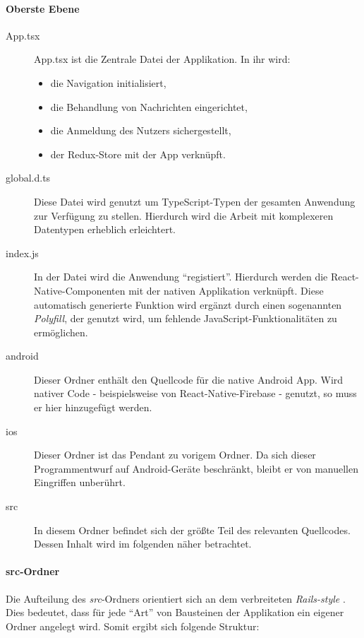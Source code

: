 \paragraph{Oberste Ebene}
\begin{description}
    \item[App.tsx]
    App.tsx ist die Zentrale Datei der Applikation. In ihr wird:
    \begin{itemize}
        \item die Navigation initialisiert,
        \item die Behandlung von Nachrichten eingerichtet,
        \item die Anmeldung des Nutzers sichergestellt,
        \item der Redux-Store mit der App verknüpft.
    \end{itemize}
    \item[global.d.ts]
    Diese Datei wird genutzt um TypeScript-Typen der gesamten Anwendung zur Verfügung zu stellen.
    Hierdurch wird die Arbeit mit komplexeren Datentypen erheblich erleichtert.
    \item[index.js]
    In der Datei wird die Anwendung \enquote{registiert}. Hierdurch werden die React-Native-Componenten mit der nativen Applikation verknüpft.
    Diese automatisch generierte Funktion wird ergänzt durch einen sogenannten \emph{Polyfill}, der genutzt wird,
    um fehlende JavaScript-Funktionalitäten zu ermöglichen. \cite{undefine14:online}
    \item[android]
    Dieser Ordner enthält den Quellcode für die native Android App.
    Wird nativer Code - beispielsweise von React-Native-Firebase - genutzt,
    so muss er hier hinzugefügt werden.
    \item[ios]
    Dieser Ordner ist das Pendant zu vorigem Ordner.
    Da sich dieser Programmentwurf auf Android-Geräte beschränkt,
    bleibt er von manuellen Eingriffen unberührt.
    \item[src]
    In diesem Ordner befindet sich der größte Teil des relevanten Quellcodes.
    Dessen Inhalt wird im folgenden näher betrachtet.
\end{description}

\paragraph{src-Ordner}
Die Aufteilung des \emph{src}-Ordners orientiert sich an dem verbreiteten \emph{Rails-style} \cite{CodeStru4:online}.
Dies bedeutet, dass für jede \enquote{Art} von Bausteinen der Applikation ein eigener Ordner angelegt wird.
Somit ergibt sich folgende Struktur:

